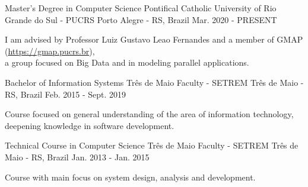 
\begin{cventries}
	\cventry
	{Master's Degree in Computer Science} %
	{Pontifical Catholic University of Rio Grande do Sul - PUCRS} %
	{Porto Alegre - RS, Brazil} %
	{Mar. 2020 - PRESENT} %
	{
		\begin{cvitems} %
			\item {I am advised by Professor Luiz Gustavo Leao Fernandes and a member of GMAP (\href{https://gmap.pucrs.br}{https://gmap.pucrs.br}),\\a group focused on Big Data and in modeling parallel applications.}
		\end{cvitems}
	}

	\cventry
	{Bachelor of Information Systems} %
	{Três de Maio Faculty - SETREM} %
	{Três de Maio - RS, Brazil} %
	{Feb. 2015 - Sept. 2019} %
	{
		\begin{cvitems} %
			\item {Course focused on general understanding of the area of information technology,\\deepening knowledge in software development.}
		\end{cvitems}
	}

	\cventry
	{Technical Course in Computer Science} %
	{Três de Maio Faculty - SETREM} %
	{Três de Maio - RS, Brazil} %
	{Jan. 2013 - Jan. 2015} %
	{
		\begin{cvitems} %
			\item {Course with main focus on system design, analysis and development.}
		\end{cvitems}
	}
\end{cventries}

